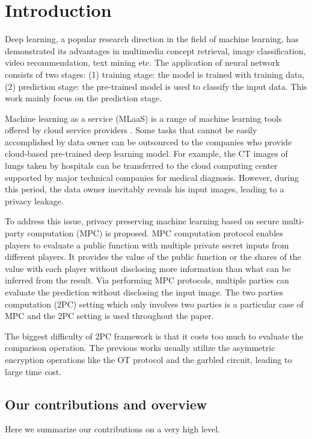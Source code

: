 \documentclass[letterpaper]{article} %
\begin{document}
\section{Introduction}



    \noindent Deep learning, a popular research direction in the field of machine learning,
    has demonstrated its advantages in multimedia concept retrieval, image classification, video recommendation, text mining etc.
    The application of neural network consists of two stages:
    (1) training stage: the model is trained with training data,
    (2) prediction stage: the pre-trained model is used to classify the input data.
    This work mainly focus on the prediction stage.

    Machine learning as a service (MLaaS) is a range of machine learning tools offered by cloud service providers \cite{ChironCloud}.
    Some tasks that cannot be easily accomplished by data owner can be outsourced to
    the companies who provide cloud-based pre-trained deep learning model.
    For example, the CT images of lungs taken by hospitals
    can be transferred to the cloud computing center
    supported by major technical companies for medical diagnosis.
    However, during this period, the data owner inevitably reveals his input images,
    leading to a privacy leakage.

    To address this issue, privacy preserving machine learning based on secure multi-party
    computation (MPC) is proposed.
    MPC computation protocol enables players to evaluate a public function
    with multiple private secret inputs from different players.
    It provides the value of the public function or the shares of the value with each player
    without disclosing more information than what can be inferred from the result.
    Via performing MPC protocols,
    multiple parties can evaluate the prediction without disclosing the input image.
    The two parties computation (2PC) setting which only involves two parties is a particular case of MPC
    and the 2PC setting is used throughout the paper.

    The biggest difficulty of 2PC framework is that it costs too much to
    evaluate the comparison operation.
    The previous works usually utilize the asymmetric encryption
    operations like the  OT protocol and the garbled circuit,
    leading to large time cost.


    \subsection{Our contributions and overview}%
    Here we summarize our contributions on a very high level.
\end{document}

